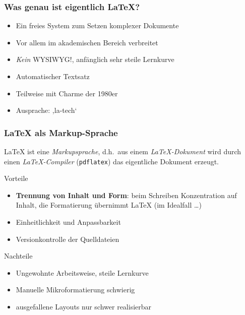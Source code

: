 \documentclass{cms-kurs}
\begin{document}
\begin{frame}
  \frametitle{Was genau ist eigentlich \LaTeX?}

  \onslide<+->

  \begin{itemize}
  \item Ein freies System zum Setzen komplexer Dokumente
  \item Vor allem im akademischen Bereich verbreitet
  \item \emph{Kein} WYSIWYG!, anfänglich sehr steile Lernkurve
  \item Automatischer Textsatz
  \item Teilweise mit Charme der 1980er
  \item Ausprache: ,la-tech‘
  \end{itemize}

\end{frame}

\begin{frame}
  \frametitle{\LaTeX{} als Markup-Sprache}

  \onslide<+->

  \LaTeX{} ist eine \emph{Markupsprache}, d.h.~aus einem \emph{\LaTeX-Dokument}
  wird durch einen \emph{\LaTeX-Compiler} (\texttt{pdflatex}) das eigentliche
  Dokument erzeugt.

  \onslide<+->

  \begin{block}{Vorteile}
    \begin{itemize}
    \item \textbf{Trennung von Inhalt und Form}: beim Schreiben
      Konzentration auf Inhalt, die Formatierung übernimmt \LaTeX{} (im
      Idealfall \dots)
    \item Einheitlichkeit und Anpassbarkeit
    \item Versionkontrolle der Quelldateien
    \end{itemize}
  \end{block}

  \onslide<+->

  \begin{block}{Nachteile}
    \begin{itemize}
    \item Ungewohnte Arbeitsweise, steile Lernkurve
    \item Manuelle Mikroformatierung schwierig
    \item ausgefallene Layouts nur schwer realisierbar
    \end{itemize}
  \end{block}

\end{frame}
\end{document}
